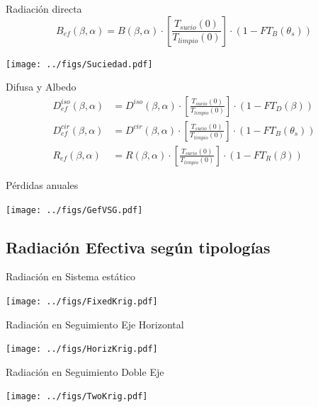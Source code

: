\documentclass[xcolor={usenames,svgnames,dvipsnames}]{beamer}
\begin{document}
\begin{frame}[label={sec:org4cdf322}]{Radiación directa}
\[B_{ef}(\beta,\alpha)=B(\beta,\alpha)\cdot\left[\frac{T_{sucio}(0)}{T_{limpio}(0)}\right]\cdot (1-FT_{B}(\theta_{s}))\]
\begin{center}
\texttt{[image: ../figs/Suciedad.pdf]}
\end{center}
\end{frame}

\begin{frame}[label={sec:orge148a6e}]{Difusa y Albedo}
\begin{align*}
D_{ef}^{iso}(\beta,\alpha) &= D^{iso}(\beta,\alpha)\cdot\left[\frac{T_{sucio}(0)}{T_{limpio}(0)}\right]\cdot(1-FT_{D}(\beta))\\
D_{ef}^{cir}(\beta,\alpha) &= D^{cir}(\beta,\alpha)\cdot\left[\frac{T_{sucio}(0)}{T_{limpio}(0)}\right]\cdot(1-FT_{B}(\theta_{s}))\\
R_{ef}(\beta,\alpha) &= R(\beta,\alpha)\cdot\left[\frac{T_{sucio}(0)}{T_{limpio}(0)}\right]\cdot(1-FT_{R}(\beta))
\end{align*}
\end{frame}
\begin{frame}[label={sec:org881157d}]{Pérdidas anuales}
\begin{center}
\texttt{[image: ../figs/GefVSG.pdf]}
\end{center}
\end{frame}

\subsection{Radiación Efectiva según tipologías}
\label{sec:org72c735f}

\begin{frame}[label={sec:orgcbbcd70}]{Radiación en Sistema estático}
\begin{center}
\texttt{[image: ../figs/FixedKrig.pdf]}
\end{center}
\end{frame}



\begin{frame}[label={sec:orgb2f8e6a}]{Radiación en Seguimiento Eje Horizontal}
\begin{center}
\texttt{[image: ../figs/HorizKrig.pdf]}
\end{center}
\end{frame}



\begin{frame}[label={sec:org0bbf11c}]{Radiación en Seguimiento Doble Eje}
\begin{center}
\texttt{[image: ../figs/TwoKrig.pdf]}
\end{center}
\end{frame}
\end{document}
